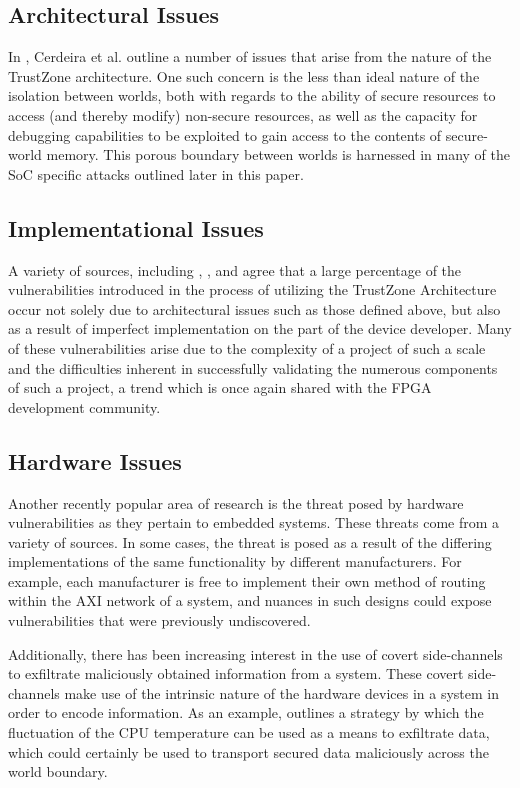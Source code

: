 \documentclass[journal]{IEEEtran}
\begin{document}
\subsection{Architectural Issues} \label{sec:Architectural Issues}
In \cite{cerdeira_sok_nodate}, Cerdeira et al. outline a number of issues that arise from
the nature of the TrustZone architecture. One such concern is the less than ideal nature 
of the isolation between worlds, both with regards to the ability of secure resources to
access (and thereby modify) non-secure resources, as well as the capacity for debugging
capabilities to be exploited to gain access to the contents of secure-world memory. This
porous boundary between worlds is harnessed in many of the SoC specific attacks outlined
later in this paper.

\subsection{Implementational Issues} \label{sec:Implementational Issues}
A variety of sources, including \cite{cerdeira_sok_nodate}, \cite{benhani_security_2019},
and \cite{benhani_security_2017} agree that a large percentage of the vulnerabilities
introduced in the process of utilizing the TrustZone Architecture occur not solely due to
architectural issues such as those defined above, but also as a result of imperfect
implementation on the part of the device developer. Many of these vulnerabilities arise
due to the complexity of a project of such a scale and the difficulties inherent in
successfully validating the numerous components of such a project, a trend which is once
again shared with the FPGA development community.

\subsection{Hardware Issues} \label{sec:Hardware Issues}
Another recently popular area of research is the threat posed by hardware vulnerabilities
as they pertain to embedded systems. These threats come from a variety of sources. In some
cases, the threat is posed as a result of the differing implementations of the same
functionality by different manufacturers. For example, each manufacturer is free to 
implement their own method of routing within the AXI network of a system, and nuances in
such designs could expose vulnerabilities that were previously undiscovered.

Additionally, there has been increasing interest in the use of covert side-channels to
exfiltrate maliciously obtained information from a system. These covert side-channels make
use of the intrinsic nature of the hardware devices in a system in order to encode
information. As an example, \cite{masti_thermal_2015} outlines a strategy by which the
fluctuation of the CPU temperature can be used as a means to exfiltrate data, which could
certainly be used to transport secured data maliciously across the world boundary.
\end{document}

